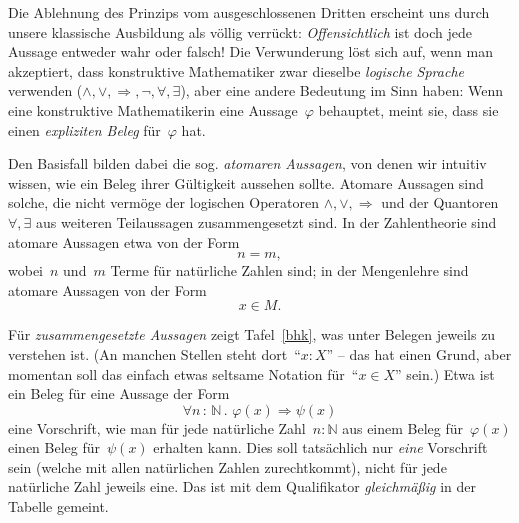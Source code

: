 \documentclass[a4paper,ngerman,12pt]{scrartcl}
\theoremstyle{definition}
\theoremstyle{plain}
\theoremstyle{remark}
\newcommand{\NN}{\mathbb{N}}
\renewcommand{\_}{\mathpunct{.}\,}
\newcommand{\?}{\,{:}\,}
\begin{document}
Die Ablehnung des Prinzips vom ausgeschlossenen Dritten erscheint uns durch
unsere klassische Ausbildung als völlig verrückt: \emph{Offensichtlich} ist
doch jede Aussage entweder wahr oder falsch! Die Verwunderung löst sich auf,
wenn man akzeptiert, dass konstruktive Mathematiker zwar dieselbe
\emph{logische Sprache} verwenden ($\wedge, \vee, \Rightarrow, \neg, \forall,
\exists$), aber eine andere Bedeutung im Sinn haben: Wenn eine konstruktive
Mathematikerin eine Aussage~$\varphi$ behauptet, meint sie, dass sie einen
\emph{expliziten Beleg} für~$\varphi$ hat.

Den Basisfall bilden dabei die sog. \emph{atomaren Aussagen}, von denen wir
intuitiv wissen, wie ein Beleg ihrer Gültigkeit aussehen sollte. Atomare Aussagen sind
solche, die nicht vermöge der logischen Operatoren $\wedge, \vee,
\Rightarrow$ und der Quantoren~$\forall, \exists$ aus weiteren Teilaussagen
zusammengesetzt sind. In der Zahlentheorie sind atomare Aussagen etwa von der
Form
\[ n = m, \]
wobei~$n$ und~$m$ Terme für natürliche Zahlen sind; in der Mengenlehre sind
atomare Aussagen von der Form
\[ x \in M. \]

Für \emph{zusammengesetzte Aussagen} zeigt Tafel~\ref{bhk}, was unter Belegen
jeweils zu verstehen ist. (An manchen Stellen steht dort~"`$x : X$"' -- das hat
einen Grund, aber momentan soll das einfach etwas seltsame Notation für~"`$x
\in X$"' sein.) Etwa ist ein Beleg für eine Aussage der Form
\[ \forall n \? \NN\_ \varphi(x) \Rightarrow \psi(x) \]
eine Vorschrift, wie man für jede natürliche Zahl~$n : \NN$ aus einem Beleg
für~$\varphi(x)$ einen Beleg für~$\psi(x)$ erhalten kann. Dies soll tatsächlich nur
\emph{eine} Vorschrift sein (welche mit allen natürlichen Zahlen zurechtkommt),
nicht für jede natürliche Zahl jeweils eine. Das ist mit dem Qualifikator \emph{gleichmäßig} in
der Tabelle gemeint.
\end{document}

